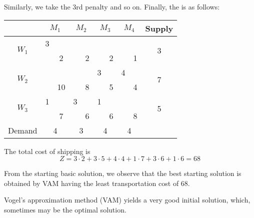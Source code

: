 \documentclass[../main-sheet.tex]{subfiles}
\begin{document}
    Similarly, we take the 3rd penalty and so on. Finally, the is as follows:
    \begin{table}[H]
        \centering
        \begin{tabular}{|c|cc|cc|cc|cc|c|}
        \hline
                               & \multicolumn{2}{c|}{$M_1$} & \multicolumn{2}{c|}{$M_2$} & \multicolumn{2}{c|}{$M_3$} & \multicolumn{2}{c|}{$M_4$} & Supply             \\ \hline
        \multirow{2}{*}{$W_1$} & 3                     &    &                        &   &                        &   &                        &   & \multirow{2}{*}{3} \\ \cline{3-3} \cline{5-5} \cline{7-7} \cline{9-9}
                               & \multicolumn{1}{c|}{} & 2  & \multicolumn{1}{c|}{}  & 2 & \multicolumn{1}{c|}{}  & 2 & \multicolumn{1}{c|}{}  & 1 &                    \\ \hline
        \multirow{2}{*}{$W_2$} &                       &    &                        &   & 3                      &   & 4                      &   & \multirow{2}{*}{7} \\ \cline{3-3} \cline{5-5} \cline{7-7} \cline{9-9}
                               & \multicolumn{1}{c|}{} & 10 & \multicolumn{1}{c|}{}  & 8 & \multicolumn{1}{c|}{}  & 5 & \multicolumn{1}{c|}{}  & 4 &                    \\ \hline
        \multirow{2}{*}{$W_3$} & 1                     &    & 3                      &   & 1                      &   &                        &   & \multirow{2}{*}{5} \\ \cline{3-3} \cline{5-5} \cline{7-7} \cline{9-9}
                               & \multicolumn{1}{c|}{} & 7  & \multicolumn{1}{c|}{}  & 6 & \multicolumn{1}{c|}{}  & 6 & \multicolumn{1}{c|}{}  & 8 &                    \\ \hline
        Demand                 & \multicolumn{2}{c|}{4}     & \multicolumn{2}{c|}{3}     & \multicolumn{2}{c|}{4}     & \multicolumn{2}{c|}{4}     &                    \\ \hline
        \end{tabular}
    \end{table}
    The total cost of shipping is 
    \[
        Z=3\cdot2+3\cdot5+4\cdot4+1\cdot7+3\cdot6+1\cdot6=68
    \]
\begin{note}
    From the starting basic solution, we observe that the best starting solution is obtained by VAM having the least transportation cost of 68.
\end{note}
\begin{rem}
    Vogel's approximation method (VAM) yields a very good initial solution, which, sometimes may be the optimal solution.
\end{rem}
\end{document}
